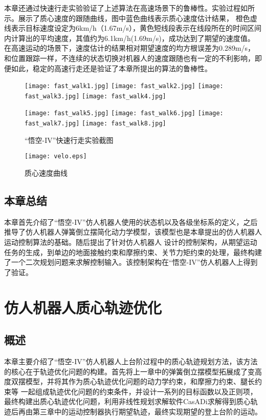 本章还通过快速行走实验验证了上述算法在高速场景下的鲁棒性。实验过程如所示。展示了质心速度的跟随曲线，图中蓝色曲线表示质心速度估计结果，
橙色虚线表示目标速度设定为6km/h（1.67m/s），黄色短线段表示在线段所在的时间区间内计算出的平均速度，其值约为6.1km/h(1.69m/s)，成功达到了期望的速度值。
在高速运动的场景下，速度估计的结果相对期望速度的均方根误差为0.289m/s，和位置跟踪一样，不连续的状态切换对机器人的速度跟随也有一定的不利影响，即便如此，稳定的高速行走还是验证了本章所提出的算法的鲁棒性。
\begin{figure}[htbp]
    \centering
    \texttt{[image: fast\_walk1.jpg]}
    \texttt{[image: fast\_walk2.jpg]}
    \texttt{[image: fast\_walk3.jpg]}
    \texttt{[image: fast\_walk4.jpg]}

    \texttt{[image: fast\_walk5.jpg]}
    \texttt{[image: fast\_walk6.jpg]}
    \texttt{[image: fast\_walk7.jpg]}
    \texttt{[image: fast\_walk8.jpg]}   
    \caption{\label{fig:fast_walk}“悟空-IV”快速行走实验截图}
\end{figure}
\begin{figure}[htbp]
    \centering
    \texttt{[image: velo.eps]}
    \caption{\label{fig:com_vel_track}质心速度曲线}
\end{figure}
\newpage
\section{本章总结}
本章首先介绍了“悟空-IV”仿人机器人使用的状态机以及各级坐标系的定义，之后推导了仿人机器人弹簧倒立摆简化动力学模型，该模型也是本章提出的仿人机器人运动控制算法的基础。随后提出了针对仿人机器人
设计的控制架构，从期望运动任务的生成，到单边的地面接触约束和摩擦约束、关节力矩约束的处理，最终构建了一个二次规划问题来求解控制输入。该控制架构在“悟空-IV”仿人机器人上得到了验证。
\chapter{仿人机器人质心轨迹优化}
\section{概述}
本章主要介绍了“悟空-IV”仿人机器人上台阶过程中的质心轨迹规划方法，该方法的核心在于轨迹优化问题的构建。首先将上一章中的弹簧倒立摆模型拓展成了变高度双摆模型，并将其作为质心轨迹优化问题的动力学约束，和摩擦力约束、腿长约束等
一起组成轨迹优化问题的约束条件，并设计一系列的目标函数以及正则项，最终构建出质心轨迹优化问题，利用非线性规划求解软件CasADi求解得到质心轨迹后再由第三章中的运动控制器执行期望轨迹，最终实现期望的登上台阶的运动。


